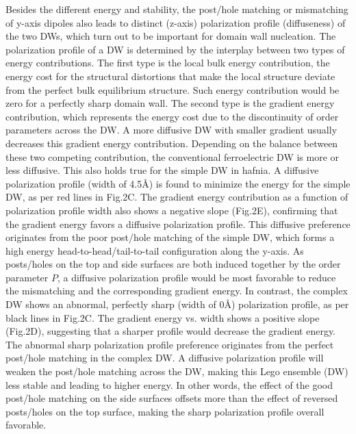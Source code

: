 \documentclass[12pt]{article}
\begin{document}
Besides the different energy and stability, the post/hole matching or mismatching of y-axis dipoles also leads to distinct (z-axis) polarization profile (diffuseness) of the two DWs, which turn out to be important for domain wall nucleation.
The polarization profile of a DW is determined by the interplay between two types of energy contributions. 
The first type is the local bulk energy contribution, the energy cost for the structural distortions that make the local structure deviate from the perfect bulk equilibrium structure.
Such energy contribution would be zero for a perfectly sharp domain wall. 
The second type is the gradient energy contribution, which represents the energy cost due to the discontinuity of order parameters across the DW. 
A more diffusive DW with smaller gradient usually decreases this gradient energy contribution.
Depending on the balance between these two competing contribution, the conventional ferroelectric DW is more or less diffusive.
This also holds true for the simple DW in hafnia.
A diffusive polarization profile (width of 4.5\AA ) is found to minimize the energy for the simple DW, as per red lines in Fig.2C. 
The gradient energy contribution as a function of polarization profile width also shows a negative slope (Fig.2E), confirming that the gradient energy favors a diffusive polarization profile.
This diffusive preference originates from the poor post/hole matching of the simple DW, which forms a high energy head-to-head/tail-to-tail configuration along the y-axis.
As posts/holes on the top and side surfaces are both induced together by the order parameter $P$, a diffusive polarization profile would be most favorable to reduce the mismatching and the corresponding gradient energy. 
In contrast, the complex DW shows an abnormal, perfectly sharp (width of 0\AA) polarization profile, as per black lines in Fig.2C.
The gradient energy vs. width shows a positive slope (Fig.2D), suggesting that a sharper profile would decrease the gradient energy. 
The abnormal sharp polarization profile preference originates from the perfect post/hole matching in the complex DW. 
A diffusive polarization profile will weaken the post/hole matching across the DW, making this Lego ensemble (DW) less stable and leading to higher energy.
In other words, the effect of the good post/hole matching on the side surfaces offsets more than the effect of reversed posts/holes on the top surface, making the sharp polarization profile overall favorable.
\end{document}
